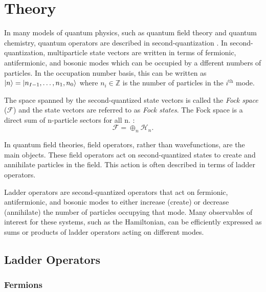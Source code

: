\section{Theory}
\label{sec:theory}

In many models of quantum physics, such as quantum field theory and quantum chemistry, quantum operators are described in second-quantization \cite{Sakurai_Napolitano_2020}.
In second-quantization, multiparticle state vectors are written in terms of fermionic, antifermionic, and bosonic modes which can be occupied by a dfferent numbers of particles.
In the occupation number basis, this can be written as $\ket{n} = \ket{n_{I-1}, \dots, n_1, n_0}$ where $n_i \in \mathbb{Z}$ is the number of particles in the $i^\text{th}$ mode.

The space spanned by the second-quantized state vectors is called the \textit{Fock space} ($\mathcal{F}$) and the state vectors are referred to as \textit{Fock states}.
The Fock space is a direct sum of n-particle sectors for all n. \cite{Schwartz_2013}:
\begin{equation}
    \mathcal{F} = \oplus_n \mathcal{H}_n.
\end{equation}

In quantum field theories, field operators, rather than wavefunctions, are the main objects.
These field operators act on second-quantized states to create and annihilate particles in the field.
This action is often described in terms of ladder operators.

Ladder operators are second-quantized operators that act on fermionic, antifermionic, and bosonic modes to either increase (create) or decrease (annihilate) the number of particles occupying that mode.
Many observables of interest for these systems, such as the Hamiltonian, can be efficiently expressed as sums or products of ladder operators acting on different modes.

\subsection{Ladder Operators}
\label{subsec:operators}

\subsubsection{Fermions}

